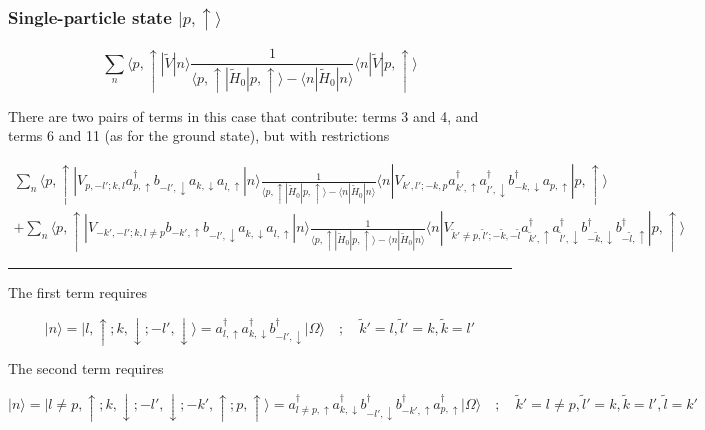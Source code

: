 \documentclass[
  letterpaper,
  DIV=11,
  numbers=noendperiod]{scrartcl}
\begin{document}
\subsubsection{\texorpdfstring{Single-particle state
\(|p,\uparrow\rangle\)}{Single-particle state \textbar p,\textbackslash uparrow\textbackslash rangle}}\label{single-particle-state-puparrowrangle}

\[
\sum_{n}\langle p,\uparrow|\tilde V|n\rangle\frac{1}{\langle p,\uparrow|\tilde H_0|p,\uparrow\rangle-\langle n|\tilde H_0|n\rangle}\langle n|\tilde V|p,\uparrow\rangle
\]

There are two pairs of terms in this case that contribute: terms 3 and
4, and terms 6 and 11 (as for the ground state), but with restrictions

\begin{multline}
\sum_{n}\langle p,\uparrow|V_{p,-l';k,l}a^\dagger_{p,\uparrow}b^{}_{-l',\downarrow}a^{}_{k,\downarrow}a^{}_{l,\uparrow}|n\rangle\frac{1}{\langle p,\uparrow|\tilde H_0|p,\uparrow\rangle-\langle n|\tilde H_0|n\rangle}\langle n|V_{k',l';-k,p}a^\dagger_{k',\uparrow}a^\dagger_{l',\downarrow}b^\dagger_{-k,\downarrow}a^{}_{p,\uparrow}|p,\uparrow\rangle\\
+
\sum_{n}\langle p,\uparrow|V_{-k',-l';k,l\ne p}b^{}_{-k',\uparrow}b^{}_{-l',\downarrow}a^{}_{k,\downarrow}a^{}_{l,\uparrow}|n\rangle\frac{1}{\langle p,\uparrow|\tilde H_0|p,\uparrow\rangle-\langle n|\tilde H_0|n\rangle}\langle n|V_{\tilde k'\ne p,\tilde l';-\tilde k,-\tilde l}a^\dagger_{\tilde k',\uparrow}a^\dagger_{\tilde l',\downarrow}b^\dagger_{-\tilde k,\downarrow}b^\dagger_{-\tilde l,\uparrow}|p,\uparrow\rangle
\end{multline}

\begin{center}\rule{0.5\linewidth}{0.5pt}\end{center}

The first term requires

\[
|n\rangle=|l,\uparrow;k,\downarrow;-l',\downarrow\rangle=a^{\dagger}_{l,\uparrow}a^{\dagger}_{k,\downarrow}b^{\dagger}_{-l',\downarrow}|\Omega\rangle
\quad;\quad \tilde k'=l,\tilde l'=k,\tilde k=l'
\]

The second term requires

\[
|n\rangle=|l\ne p,\uparrow;k,\downarrow;-l',\downarrow;-k',\uparrow;p,\uparrow\rangle=a^{\dagger}_{l\ne p,\uparrow}a^{\dagger}_{k,\downarrow}b^{\dagger}_{-l',\downarrow}b^{\dagger}_{-k',\uparrow}a^{\dagger}_{p,\uparrow}|\Omega\rangle
\quad;\quad \tilde k'=l\ne p,\tilde l'=k,\tilde k=l',\tilde l=k'
\]
\end{document}
